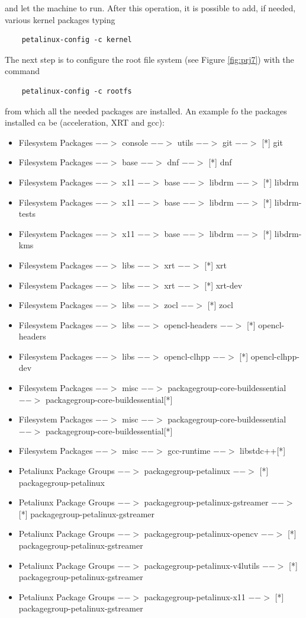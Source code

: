 and let the machine to run. After this operation, it is possible to add, if needed, various kernel packages typing
\begin{verbatim}
	petalinux-config -c kernel
\end{verbatim}
The next step is to configure the root file system (see Figure \ref{fig:prj7}) with the command
\begin{verbatim}
	petalinux-config -c rootfs
\end{verbatim}
from which all the needed packages are installed. An example fo the packages installed ca be (acceleration, XRT and gcc):
\begin{itemize}
	\item Filesystem Packages $-->$ console $-->$ utils $-->$ git $-->$ [*] git
	\item Filesystem Packages $-->$ base $-->$ dnf $-->$ [*] dnf
	\item Filesystem Packages $-->$ x11 $-->$ base $-->$ libdrm $-->$ [*] libdrm
	\item Filesystem Packages $-->$ x11 $-->$ base $-->$ libdrm $-->$ [*] libdrm-tests
	\item Filesystem Packages $-->$ x11 $-->$ base $-->$ libdrm $-->$ [*] libdrm-kms
	\item Filesystem Packages $-->$ libs $-->$ xrt $-->$ [*] xrt
	\item Filesystem Packages $-->$ libs $-->$ xrt $-->$ [*] xrt-dev
	\item Filesystem Packages $-->$ libs $-->$ zocl $-->$ [*] zocl 
	\item Filesystem Packages $-->$ libs $-->$ opencl-headers $-->$ [*] opencl-headers 
	\item Filesystem Packages $-->$ libs $-->$ opencl-clhpp $-->$ [*] opencl-clhpp-dev
	\item Filesystem Packages $-->$ misc $-->$ packagegroup-core-buildessential $-->$ packagegroup-core-buildessential[*]
	\item Filesystem Packages $-->$ misc $-->$ packagegroup-core-buildessential $-->$ packagegroup-core-buildessential[*]
	\item Filesystem Packages $-->$ misc $-->$ gcc-runtime $-->$ libstdc++[*]
	\item Petaliunx Package Groups $-->$ packagegroup-petalinux $-->$ [*] packagegroup-petalinux
	\item Petaliunx Package Groups $-->$ packagegroup-petalinux-gstreamer $-->$ [*] packagegroup-petalinux-gstreamer
	\item Petaliunx Package Groups $-->$ packagegroup-petalinux-opencv $-->$ [*] packagegroup-petalinux-gstreamer
	\item Petaliunx Package Groups $-->$ packagegroup-petalinux-v4lutils $-->$ [*] packagegroup-petalinux-gstreamer
	\item Petaliunx Package Groups $-->$ packagegroup-petalinux-x11 $-->$ [*] packagegroup-petalinux-gstreamer
\end{itemize}

